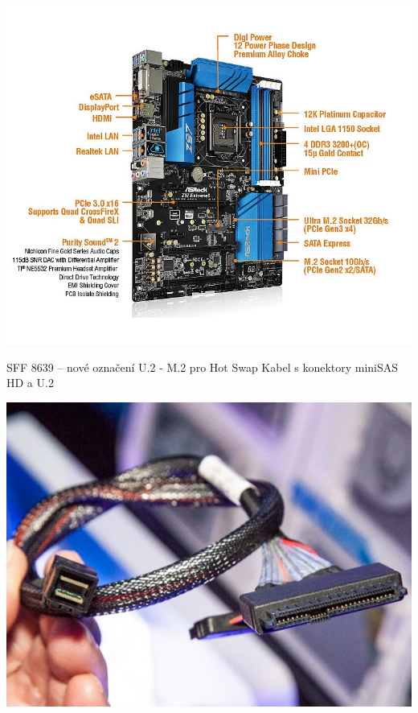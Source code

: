 \documentclass[aspectratio=43]{beamer}
\begin{document}
\begin{frame}{}
	 
	\begin{center}
		\includegraphics[width=1\linewidth]{extrahovane_obrazky/img_2_page27_0.png}
	\end{center}
	
\end{frame}


\begin{frame}{SFF 8639 – nové označení U.2 - M.2 pro Hot Swap}
	Kabel s konektory miniSAS HD a U.2
	\begin{center}
		\includegraphics[width=0.8\linewidth]{extrahovane_obrazky/img_2_page28_1.jpeg}
	\end{center}
	
\end{frame}
\end{document}
